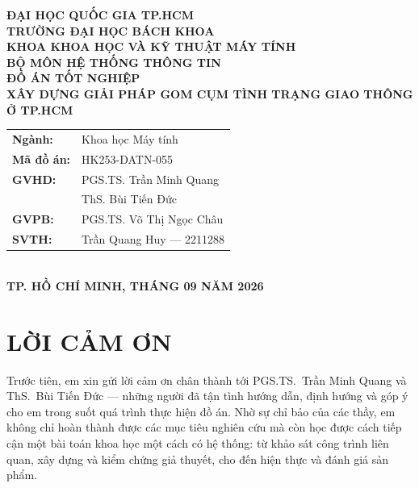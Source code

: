 \documentclass[12pt,a4paper]{report}
\newcommand{\tentruong}{TRƯỜNG ĐẠI HỌC BÁCH KHOA}
\newcommand{\tendetai}{XÂY DỰNG GIẢI PHÁP GOM CỤM TÌNH TRẠNG GIAO THÔNG Ở TP.HCM}
\begin{document}
\begin{titlepage}
\begin{center}
{\bfseries\fontsize{14pt}{18pt}\selectfont ĐẠI HỌC QUỐC GIA TP.HCM\\[2pt]
\MakeUppercase{\tentruong}\\[2pt]
KHOA KHOA HỌC VÀ KỸ THUẬT MÁY TÍNH\\[2pt]
BỘ MÔN HỆ THỐNG THÔNG TIN}\\[3.6cm]

{\bfseries\fontsize{18pt}{24pt}\selectfont ĐỒ ÁN TỐT NGHIỆP}\\[1.2cm]
{\bfseries\fontsize{17pt}{24pt}\selectfont \tendetai}\\[2.4cm]

\begin{tabular}{ll}
{\bfseries Ngành:} & Khoa học Máy tính\\[4pt]
{\bfseries Mã đồ án:} & HK253-DATN-055\\[4pt]
{\bfseries GVHD:} & PGS.TS. Trần Minh Quang\\[2pt]
 & ThS. Bùi Tiến Đức\\[4pt]
{\bfseries GVPB:} & PGS.TS. Võ Thị Ngọc Châu\\[4pt]
{\bfseries SVTH:} & Trần Quang Huy --- 2211288\\
\end{tabular}\\[2.4cm]

{\bfseries\fontsize{14pt}{18pt}\selectfont TP. HỒ CHÍ MINH, THÁNG 09 NĂM 2026}
\end{center}
\end{titlepage}

\chapter*{LỜI CẢM ƠN}
Trước tiên, em xin gửi lời cảm ơn chân thành tới PGS.TS.~Trần Minh Quang và ThS.~Bùi Tiến Đức --- những người đã tận tình hướng dẫn, định hướng và góp ý cho em trong suốt quá trình thực hiện đồ án. Nhờ sự chỉ bảo của các thầy, em không chỉ hoàn thành được các mục tiêu nghiên cứu mà còn học được cách tiếp cận một bài toán khoa học một cách có hệ thống: từ khảo sát công trình liên quan, xây dựng và kiểm chứng giả thuyết, cho đến hiện thực và đánh giá sản phẩm.
\end{document}

